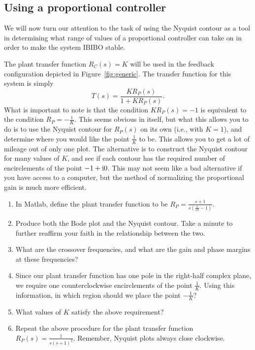 \subsection{Using a proportional controller}

We will now turn our attention to the task of using the Nyquist contour as a
tool in determining what range of values of a proportional controller can
take on in order to make the system IBIBO stable.

The plant transfer function $R_{C}(s) = K$ will be used in the feedback
configuration depicted in Figure~\ref{fig:generic}\@.  The transfer function
for this system is simply
\begin{equation*}
T(s)=\frac{KR_{P}(s)}{1+KR_{P}(s)}.
\end{equation*}
What is important to note is that the condition $KR_{P}(s)=-1$ is equivalent
to the condition $R_{P}=-\frac{1}{K}$. This seems obvious in itself, but what
this allows you to do is to use the Nyquist contour for $R_{P}(s)$ on its own
(i.e., with $K=1$), and determine where you would like the point
$\frac{1}{K}$ to be. This allows you to get a lot of mileage out of only one
plot. The alternative is to construct the Nyquist contour for many values of
$K$, and see if each contour has the required number of encirclements of the
point $-1+\textup{i}0$\@.  This may not seem like a bad alternative if you have
access to a computer, but the method of normalizing the proportional gain is
much more efficient.

\begin{enumerate}
\item In \textsf{Matlab}, define the plant transfer function to be
$R_{P}=\frac{s+1}{s(\frac{s}{10}-1)}$.

\item Produce both the Bode plot and the Nyquist contour.  Take a minute to
further reaffirm your faith in the relationship between the two.

\item What are the crossover frequencies, and what are the gain and phase
margins at these frequencies?

\item Since our plant transfer function has one pole in the right-half
complex plane, we require one counterclockwise encirclements of the point
$\frac{1}{K}$. Using this information, in which region should we place the
point $-\frac{1}{K}$?

\item What values of $K$ satisfy the above requirement?

\item Repeat the above procedure for the plant transfer function
$R_{P}(s)=\frac{1}{s(s+1)^{2}}$.  Remember, Nyquist plots always close
clockwise.
\end{enumerate}

